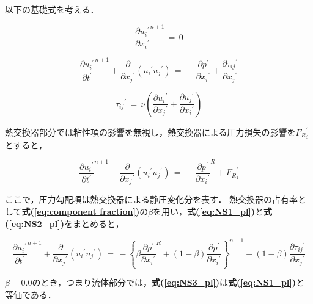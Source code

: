 以下の基礎式を考える．

\begin{equation}
{\frac{\partial{{u}_{i}}^{\prime}}{\partial{{x}_{i}}^{\prime}}}^{n+1} \, =\, {0}
\label{eq:continuity_pl}
\end{equation}

\begin{equation}
{\frac{\partial{u_{i}}^{\prime}}{\partial{t}^{\prime}}}^{n+1} + \frac{\partial}{\partial{x_{j}}^{\prime}} \left({ {u_{i}}^{\prime} {u_{j}}^{\prime} }\right)
\, =\,
- \frac{\partial{p}^{\prime}}{\partial{x_{i}}^{\prime}} + \frac{\partial {\tau_{ij}}^{\prime}}{\partial{x_{j}}^{\prime}}
\label{eq:NS1_pl}
\end{equation}

\begin{equation}
{\tau_{ij}}^{\prime}
\,=\,
\nu \left({ \frac{\partial{u_{i}}^{\prime}}{\partial{x_{j}}^{\prime}} + \frac{\partial{u_{j}}^{\prime}}{\partial{x_{i}}^{\prime}} }\right)
\label{eq:tensor_pl}
\end{equation}

熱交換器部分では粘性項の影響を無視し，熱交換器による圧力損失の影響を${F_{R}}_{i}^{\prime}$とすると，

\begin{equation}
{\frac{\partial{u_{i}}^{\prime}}{\partial{t}^{\prime}}}^{n+1} + \frac{\partial}{\partial{x_{j}}^{\prime}} \left({ {u_{i}}^{\prime} {u_{j}}^{\prime} }\right)
\, =\,
- {\frac{\partial{p}^{\prime}}{\partial{x_{i}}^{\prime}}}^{R} + {F_{R}}_{i}^{\prime}
\label{eq:NS2_pl}
\end{equation}

ここで，圧力勾配項は熱交換器による静圧変化分を表す．
熱交換器の占有率として\textbf{式(\ref{eq:component fraction})}の$\beta$を用い，\textbf{式(\ref{eq:NS1_pl})}と\textbf{式(\ref{eq:NS2_pl})}をまとめると，

\begin{equation}
{\frac{\partial{u_{i}}^{\prime}}{\partial{t}^{\prime}}}^{n+1} + \frac{\partial}{\partial{x_{j}}^{\prime}} \left({ {u_{i}}^{\prime} {u_{j}}^{\prime} }\right)
\, =\,
- {\left\{{ \beta {\frac{\partial{p}^{\prime}}{\partial{x_{i}}^{\prime}}}^{R} + (1-\beta) \frac{\partial{p}^{\prime}}{\partial{x_{i}}^{\prime}} }\right\}}^{n+1} + (1-\beta) \frac{\partial{\tau_{ij}}^{\prime}}{\partial{x_{j}}^{\prime}}
\label{eq:NS3_pl}
\end{equation}

$\beta=0.0$のとき，つまり流体部分では，\textbf{式(\ref{eq:NS3_pl})}は\textbf{式(\ref{eq:NS1_pl})}と等価である．

